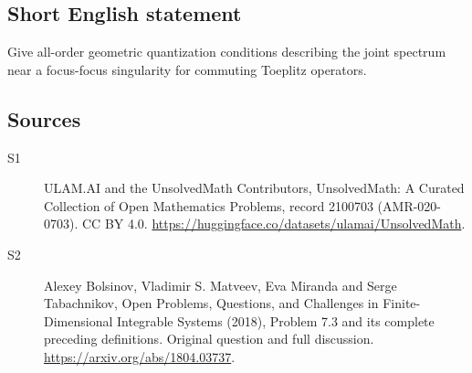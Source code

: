 \documentclass[11pt]{article}
\begin{document}
\subsection{Short English statement}
Give all-order geometric quantization conditions describing the joint spectrum near a focus-focus singularity for commuting Toeplitz operators.
\subsection{Sources}
\begin{description}
\item[\hypertarget{source:2100703:1}{S1}] ULAM.AI and the UnsolvedMath Contributors, UnsolvedMath: A Curated Collection of Open Mathematics Problems, record 2100703 (AMR-020-0703). CC BY 4.0. \url{https://huggingface.co/datasets/ulamai/UnsolvedMath}.
\item[\hypertarget{source:2100703:2}{S2}] Alexey Bolsinov, Vladimir S. Matveev, Eva Miranda and Serge Tabachnikov, Open Problems, Questions, and Challenges in Finite-Dimensional Integrable Systems (2018), Problem 7.3 and its complete preceding definitions. Original question and full discussion. \url{https://arxiv.org/abs/1804.03737}.

\end{description}
\label{end:2100703}
\end{document}
